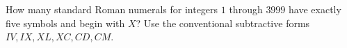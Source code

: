 How many standard Roman numerals for integers $1$ through $3999$ have exactly five symbols and begin with $X$? Use the conventional subtractive forms $IV,IX,XL,XC,CD,CM$.
